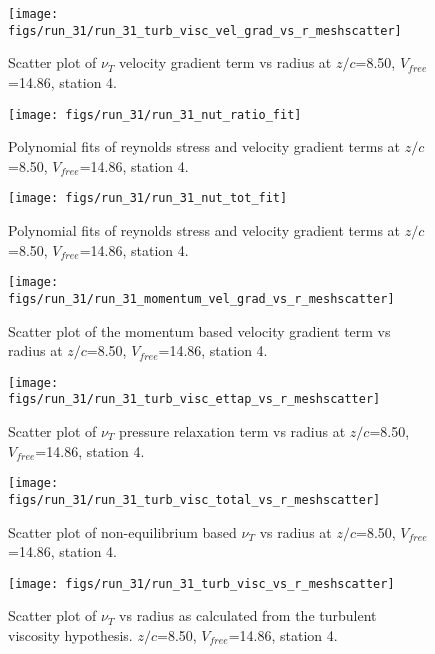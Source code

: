 \begin{figure}[H]
\centering
\texttt{[image: figs/run\_31/run\_31\_turb\_visc\_vel\_grad\_vs\_r\_meshscatter]}
\caption{Scatter plot of $\nu_T$ velocity gradient term vs radius at $z/c$=8.50, $V_{free}$=14.86, station 4.}
\end{figure}


\begin{figure}[H]
\centering
\texttt{[image: figs/run\_31/run\_31\_nut\_ratio\_fit]}
\caption{Polynomial fits of reynolds stress and velocity gradient terms at $z/c$=8.50, $V_{free}$=14.86, station 4.}
\end{figure}


\begin{figure}[H]
\centering
\texttt{[image: figs/run\_31/run\_31\_nut\_tot\_fit]}
\caption{Polynomial fits of reynolds stress and velocity gradient terms at $z/c$=8.50, $V_{free}$=14.86, station 4.}
\end{figure}


\begin{figure}[H]
\centering
\texttt{[image: figs/run\_31/run\_31\_momentum\_vel\_grad\_vs\_r\_meshscatter]}
\caption{Scatter plot of the momentum based velocity gradient term vs radius at $z/c$=8.50, $V_{free}$=14.86, station 4.}
\end{figure}


\begin{figure}[H]
\centering
\texttt{[image: figs/run\_31/run\_31\_turb\_visc\_ettap\_vs\_r\_meshscatter]}
\caption{Scatter plot of $\nu_T$ pressure relaxation term vs radius at $z/c$=8.50, $V_{free}$=14.86, station 4.}
\end{figure}


\begin{figure}[H]
\centering
\texttt{[image: figs/run\_31/run\_31\_turb\_visc\_total\_vs\_r\_meshscatter]}
\caption{Scatter plot of non-equilibrium based $\nu_T$ vs radius at $z/c$=8.50, $V_{free}$=14.86, station 4.}
\end{figure}


\begin{figure}[H]
\centering
\texttt{[image: figs/run\_31/run\_31\_turb\_visc\_vs\_r\_meshscatter]}
\caption{Scatter plot of $\nu_T$ vs radius as calculated from the turbulent viscosity hypothesis. $z/c$=8.50, $V_{free}$=14.86, station 4.}
\end{figure}


